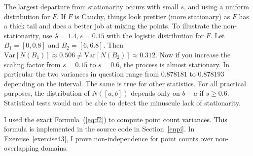 \documentclass[10pt]{article}
\begin{document}
\begin{Exercise}
The largest departure from  \textcolor{index}{stationarity} occurs with small $s$, and using a uniform distribution for $F$. If $F$ is Cauchy, things look prettier (more stationary) as $F$ has a thick tail and does a better job at mixing the points. To illustrate the non-stationarity,  use $\lambda=1.4, s=0.15$ with the logistic distribution for $F$. 
Let $B_1=[0,0.8]$ and $B_2=[6,6.8]$. Then $\mbox{Var}[N(B_1)]\approx0.506 \neq \mbox{Var}[N(B_2)]\approx 0.312$. Now if you increase the scaling factor from
 $s=0.15$ to $s=0.6$, the process is almost stationary. In particular the two variances in question range from $0.878181$ to $0.878193$ depending on the interval. The same is true for other statistics. For all practical purposes, the distribution of $N([a,b])$ depends only on $b-a$ if $s\geq 0.6$. Statistical tests would not be able to detect the minuscule lack of stationarity.

I used the exact Formula~(\ref{eq:f2})
to compute point count variances. This formula is implemented in the source code in Section~\ref{enpi}. 
In Exercise~\ref{exercise43}, I prove non-independence for point counts over non-overlapping domains. 
\end{Exercise}
\end{document}
